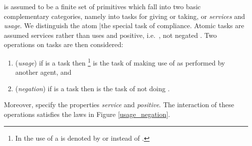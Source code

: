 \documentclass{pseudoelsart}
\begin{document}
 is assumed to be a finite set of primitives which fall into two
basic complementary
categories, namely into tasks for giving or taking, or \emph{services} and \emph{usage}.
We distinguish the atom |the special task of compliance.
Atomic tasks are assumed services rather than uses and positive, i.e.\ , not 
negated . Two operations  on 
tasks
are then considered:
\begin{enumerate}
\item (\emph{usage}) if  is a task then \footnote{In \cite{B06,BF06}
the use of a  is denoted by  or  instead of .} is the task of making use of  as performed by
another agent, and
\item (\emph{negation}) if  is a task then  is the task of not doing .
\end{enumerate}
Moreover,  specify the properties \emph{service} and 
\emph{positive}.
The interaction of these operations satisfies the laws in Figure \ref{usage_negation}.
\end{document}
